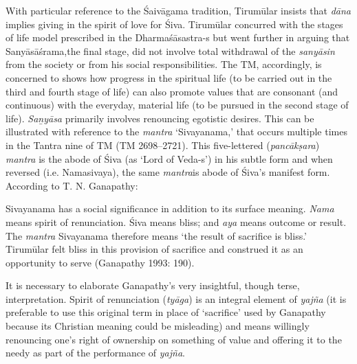 With particular reference to the Śaivāgama tradition, Tirumūlar insists that \textit{dāna} implies giving in the spirit of love for Śiva. Tirumūlar concurred with the stages of life model prescribed in the Dharmaśāsastra-s but went further in arguing that Sanyāsāśrama,\break the final stage, did not involve total withdrawal of the \textit{sanyāsin} from the society or from his social responsibilities. The TM, accordingly, is concerned to shows how progress in the spiritual life (to be carried out in the third and fourth stage of life) can also promote values that are consonant (and continuous) with the everyday, material life (to be pursued in the second stage of life). \textit{Saṉyāsa} primarily involves renouncing egotistic desires. This can be illustrated with reference to the \textit{mantra} ‘Sivayanama,’ that occurs multiple times in the Tantra nine of TM (TM 2698–2721). This five-lettered (\textit{pancākṣara}) \textit{mantra} is the abode of Śiva (as ‘Lord of Veda-s’) in his subtle form and when reversed (i.e. Namasivaya), the same \textit{mantra}is abode of Śiva’s manifest form. According to T. N. Ganapathy:

\begin{myquote}
Sivayanama has a social significance in addition to its surface meaning. \textit{Nama} means spirit of renunciation. Śiva means bliss; and \textit{aya} means outcome or result. The \textit{mantra} Sivayanama therefore means ‘the result of sacrifice is bliss.’ Tirumūlar felt bliss in this provision of sacrifice and construed it as an opportunity to serve (Ganapathy 1993: 190).
\end{myquote}

It is necessary to elaborate Ganapathy’s very insightful, though terse, interpretation. Spirit of renunciation (\textit{tyāga}) is an integral element of \textit{yajña} (it is preferable to use this original term in place of ‘sacrifice’ used by Ganapathy because its Christian meaning could be misleading) and means willingly renouncing one’s right of ownership on something of value and offering it to the needy as part of the performance of \textit{yajña}.

